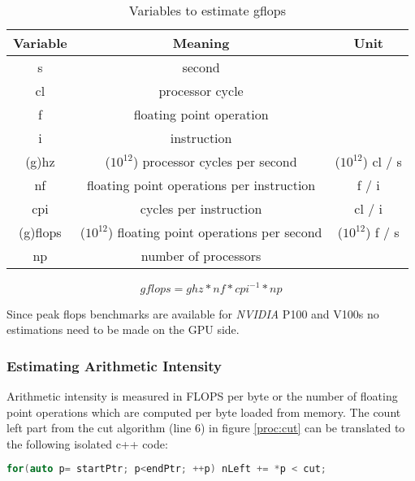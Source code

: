 \documentclass[]{article}
\begin{document}
\small
\begin{table}[H]
	\begin{center}
			\begin{tabular}{@{} c | c | c }
				Variable & Meaning & Unit\\ 
				\hline
				s & second \\
				cl & processor cycle \\
				f & floating point operation \\
				i & instruction \\
				(g)hz & ($10^{12}$) processor cycles per second & ($10^{12}$) cl / s\\
				nf & floating point operations per instruction & f / i\\
				cpi & cycles per instruction & cl / i \\
				(g)flops &  ($10^{12}$) floating point operations per second & ($10^{12}$) f / s\\
				np & number of processors \\
			
		\end{tabular}
	\end{center}
	\caption{Variables to estimate gflops}
	\label{fig:gflops}
\end{table}

\begin{center}
	\begin{equation}\label{eq:avx}
		gflops = ghz * nf * cpi^{-1} * np
	\end{equation}
\end{center}

Since peak flops benchmarks are available for \textit{NVIDIA} P100 and V100s no estimations need to be made on the GPU side.

\subsubsection{Estimating Arithmetic Intensity}

Arithmetic intensity is measured in FLOPS per byte or the number of floating point operations which are computed per byte loaded from memory. The count left part from the cut algorithm (line 6) in figure \ref{proc:cut} can be translated to the following isolated c++ code:

\begin{lstlisting}[language=c++, caption=Counting the particles left of a cut plane, label=Minimal Count Left C++]
	for(auto p= startPtr; p<endPtr; ++p) nLeft += *p < cut;
\end{lstlisting}
\end{document}
